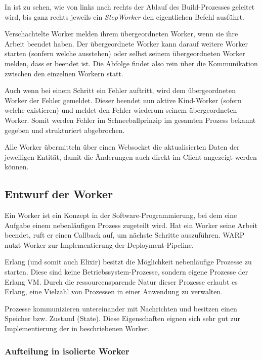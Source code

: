 In  ist zu sehen, wie von links nach rechts der Ablauf des Build-Prozesses geleitet wird, bis ganz rechts jeweils ein \emph{StepWorker} den eigentlichen Befehl ausführt.

Verschachtelte Worker melden ihrem übergeordneten Worker, wenn sie ihre Arbeit beendet haben. Der übergeordnete Worker kann darauf weitere Worker starten (sonfern welche ausstehen) oder selbst seinem übergeordneten Worker melden, dass er beendet ist. Die Abfolge findet also rein über die Kommunikation zwischen den einzelnen Workern statt.

Auch wenn bei einem Schritt ein Fehler auftritt, wird dem übergeordneten Worker der Fehler gemeldet. Dieser beendet nun aktive Kind-Worker (sofern welche existieren) und meldet den Fehler wiederum seinem übergeordneten Worker. Somit werden Fehler im Schneeballprinzip im gesamten Prozess bekannt gegeben und strukturiert abgebrochen.

Alle Worker übermitteln über einen Websocket die aktualisierten Daten der jeweiligen Entität, damit die Änderungen auch direkt im Client angezeigt werden können.

\subsection{Entwurf der Worker}

Ein Worker ist ein Konzept in der Software-Programmierung, bei dem eine Aufgabe einem nebenläufigen Prozess zugeteilt wird. Hat ein Worker seine Arbeit beendet, ruft er einen Callback auf, um nächste Schritte auszuführen. WARP nutzt Worker zur Implementierung der Deployment-Pipeline.

Erlang (und somit auch Elixir) besitzt die Möglichkeit nebenläufige Prozesse zu starten. Diese sind keine Betriebssystem-Prozesse, sondern eigene Prozesse der Erlang VM. Durch die ressourcensparende Natur dieser Prozesse erlaubt es Erlang, eine Vielzahl von Prozessen in einer Anwendung zu verwalten. \citep[133]{Armstrong2007}

Prozesse kommunizieren untereinander mit Nachrichten und besitzen einen Speicher bzw. Zustand (State). Diese Eigenschaften eignen sich sehr gut zur Implementierung der in  beschriebenen Worker.

\subsubsection{Aufteilung in isolierte Worker}
\label{subsec:aufteilung-der-worker}

